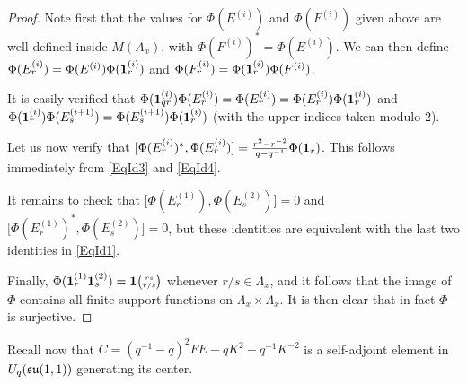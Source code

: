 \begin{proof} Note first that the values for $\Phi(E^{(i)})$ and $\Phi(F^{(i)})$ given above are well-defined inside $M(A_x)$, with $\Phi(F^{(i)})^* = \Phi(E^{(i)})$. We can then define $\Phi(E^{(i)}_r) = \Phi(E^{(i)})\Phi(\mathbf{1}_r^{(i)})$ and $\Phi(F^{(i)}_r) = \Phi(\mathbf{1}_r^{(i)})\Phi(F^{(i)})$. 

It is  easily verified that $\Phi(\mathbf{1}_{qr}^{(i)})\Phi(E^{(i)}_r) = \Phi(E^{(i)}_r) = \Phi(E^{(i)}_r)\Phi(\mathbf{1}_r^{(i)})$ and $\Phi(\mathbf{1}_r^{(i)})\Phi(E^{(i+1)}_s) = \Phi(E^{(i+1)}_s)\Phi(\mathbf{1}_r^{(i)})$ (with the upper indices taken modulo 2).

Let us now verify that $\lbrack \Phi(E^{(i)}_r)^*,\Phi(E^{(i)}_r)\rbrack = \frac{r^2-r^{-2}}{q-q^{-1}}\Phi(\mathbf{1}_r)$. This follows immediately from \eqref{EqId3} and \eqref{EqId4}.

It remains to check that $\lbrack \Phi(E^{(1)}_r),\Phi(E^{(2)}_s)\rbrack = 0$ and $\lbrack \Phi(E^{(1)}_r)^*,\Phi(E^{(2)}_s)\rbrack = 0$, but these identities are equivalent with the last two identities in \eqref{EqId1}.

Finally, $\Phi(\mathbf{1}_r^{(1)}\mathbf{1}_s^{(2)}) = \mathbf{1}{\tiny {\begin{pmatrix} rs\\r/s\end{pmatrix}}}$ whenever $r/s\in \Lambda_x$, and it follows that the image of $\Phi$ contains all finite support functions on $\Lambda_x\times \Lambda_x$. It is then clear that in fact $\Phi$ is surjective. 
\end{proof}

Recall now that $C = (q^{-1}-q)^2FE-qK^2-q^{-1}K^{-2}$ is a self-adjoint element in $U_q(\mathfrak{su}(1,1))$ generating its center. 

